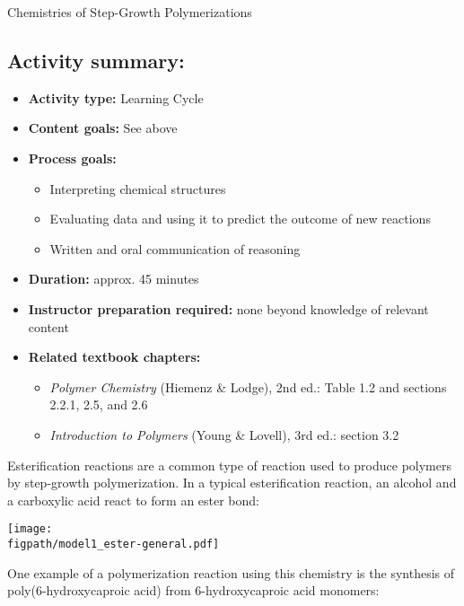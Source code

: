 \begin{activity}{Chemistries of Step-Growth Polymerizations}
\begin{instructornotes}
	\subsection*{Activity summary:}
	\begin{itemize}
		\item \textbf{Activity type:} Learning Cycle
		\item \textbf{Content goals:} See above
		\item \textbf{Process goals:} %
			\begin{itemize}
				\item Interpreting chemical structures
				\item Evaluating data and using it to predict the outcome of new reactions
				\item Written and oral communication of reasoning
			\end{itemize}
		\item \textbf{Duration:} approx. 45 minutes
		\item \textbf{Instructor preparation required:} none beyond knowledge of relevant content
		\item \textbf{Related textbook chapters:}
			\begin{itemize}
				\item \emph{Polymer Chemistry} (Hiemenz \& Lodge), 2nd ed.: Table 1.2 and sections 2.2.1, 2.5, and 2.6
				\item \emph{Introduction to Polymers} (Young \& Lovell), 3rd ed.: section 3.2
			\end{itemize}
	\end{itemize}

\end{instructornotes}


\begin{model}
\label{\labelbase:mdl:polyester}

	Esterification reactions are a common type of reaction used to produce polymers by step-growth polymerization.
	In a typical esterification reaction, an alcohol and a carboxylic acid react to form an ester bond:
	
	\centerline{\texttt{[image: \\figpath/model1\_ester-general.pdf]}}
	
	One example of a polymerization reaction using this chemistry is the synthesis of poly(6-hydroxycaproic acid) from 6-hydroxycaproic acid monomers:
	

\end{model}
\end{activity}

